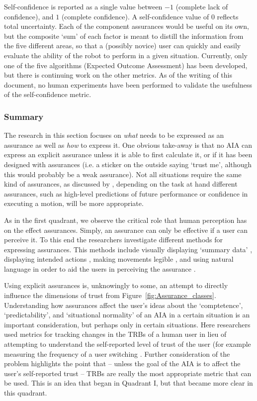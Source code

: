 Self-confidence is reported as a single value between $-1$ (complete lack of confidence), and $1$ (complete confidence). A self-confidence value of $0$ reflects total uncertainty. Each of the component assurances would be useful on its own, but the composite `sum' of each factor is meant to distill the information from the five different areas, so that a (possibly novice) user can quickly and easily evaluate the ability of the robot to perform in a given situation. Currently, only one of the five algorithms (Expected Outcome Assessment) has been developed, but there is continuing work on the other metrics. As of the writing of this document, no human experiments have been performed to validate the usefulness of the self-confidence metric. 

\subsubsection{Summary}
The research in this section focuses on \emph{what} needs to be expressed as an assurance as well as \emph{how} to express it. One obvious take-away is that no AIA can express an explicit assurance unless it is able to first calculate it, or if it has been designed with assurances (i.e. a sticker on the outside saying `trust me', although this would probably be a weak assurance). Not all situations require the same kind of assurances, as discussed by \cite{Chen2014-dk}, depending on the task at hand different assurances, such as high-level predictions of future performance or confidence in executing a motion, will be more appropriate.

As in the first quadrant, we observe the critical role that human perception has on the effect assurances. Simply, an assurance can only be effective if a user can perceive it. To this end the researchers investigate different methods for expressing assurances. This methods include visually displaying `summary data' \cite{Muir1996-gt}, displaying intended actions \cite{Chadalavada2015-wx}, making movements legible \cite{Dragan2013-wd}, and using natural language in order to aid the users in perceiving the assurance \cite{Wang2016-id}.

Using explicit assurances is, unknowingly to some, an attempt to directly influence the dimensions of trust from Figure~\ref{fig:Assurance_classes}. Understanding how assurances affect the user's ideas about the `comptetence', `predictability', and `situational normality' of an AIA in a certain situation is an important consideration, but perhaps only in certain situations. Here researchers used metrics for tracking changes in the TRBs of a human user in lieu of attempting to understand the self-reported level of trust of the user (for example measuring the frequency of a user switching . Further consideration of the problem highlights the point that -- unless the goal of the AIA is to affect the user's self-reported trust -- TRBs are really the most appropriate metric that can be used. This is an idea that began in Quadrant I, but that became more clear in this quadrant.

